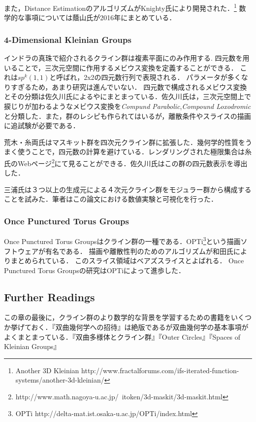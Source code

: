 また，Distance EstimationのアルゴリズムがKnighty氏により開発された．\footnote{Another 3D Kleinian http://www.fractalforums.com/ifs-iterated-function-systems/another-3d-kleinian/}
数学的な事項については蔭山氏が2016年にまとめている\cite{kageyama}．

\subsubsection{4-Dimensional Kleinian Groups}
インドラの真珠で紹介されるクライン群は複素平面にのみ作用する.
四元数を用いることで，三次元空間に作用するメビウス変換を定義することができる．
これは$sp^k(1, 1)$と呼ばれ，2x2の四元数行列で表現される．
パラメータが多くなりすぎるため，あまり研究は進んでいない．
四元数で構成されるメビウス変換とその分類は佐久川氏による\cite{sakugawaMaster}や\cite{accidentalParabolic}にまとまっている．佐久川氏は，三次元空間上で捩じりが加わるようなメビウス変換を{\it Compund Parabolic},{\it Compound Loxodromic}と分類した．また，群のレシピも作られてはいるが，離散条件やスライスの描画に追試験が必要である．

荒木・糸両氏はマスキット群を四次元クライン群に拡張した\cite{maskit}．幾何学的性質をうまく使うことで，四元数の計算を避けている．レンダリングされた極限集合は糸氏のWebページ\footnote{http://www.math.nagoya-u.ac.jp/~itoken/3d-maskit/3d-maskit.html}にて見ることができる．佐久川氏はこの群の四元数表示を導出した\cite{sakugawa4d}．

三浦氏は３つ以上の生成元による４次元クライン群をモジュラー群から構成することを試みた\cite{miura}．筆者はこの論文における数値実験と可視化を行った．

\subsubsection{Once Punctured Torus Groups}
Once Punctured Torus Groupsはクライン群の一種である．OPTi\footnote{OPTi http://delta-mat.ist.osaka-u.ac.jp/OPTi/index.html}という描画ソフトウェアが有名である．
描画\cite{OPTiDrawing}や離散性判\cite{OPTiDiscrete}のためのアルゴリズムが和田氏によりまとめられている．
このスライス領域はベアズスライスとよばれる．
Once Punctured Torus Groupsの研究はOPTiによって進歩した．

\subsection{Further Readings}
この章の最後に，クライン群のより数学的な背景を学習するための書籍をいくつか挙げておく．『双曲幾何学への招待』\cite{invitation}は絶版であるが双曲幾何学の基本事項がよくまとまっている．『双曲多様体とクライン群』\cite{manifold}『Outer Circles』\cite{outerCircles}『Spaces of Kleinian Groups』\cite{space}